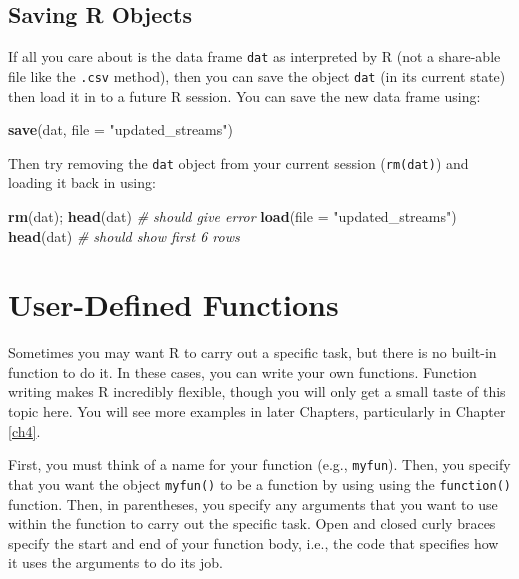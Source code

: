 \documentclass[]{book}
\newenvironment{Shaded}{\begin{snugshade}}{\end{snugshade}}
\newcommand{\KeywordTok}[1]{\textcolor[rgb]{0.13,0.29,0.53}{\textbf{#1}}}
\newcommand{\DataTypeTok}[1]{\textcolor[rgb]{0.13,0.29,0.53}{#1}}
\newcommand{\StringTok}[1]{\textcolor[rgb]{0.31,0.60,0.02}{#1}}
\newcommand{\CommentTok}[1]{\textcolor[rgb]{0.56,0.35,0.01}{\textit{#1}}}
\newcommand{\NormalTok}[1]{#1}
\theoremstyle{definition}
\theoremstyle{definition}
\theoremstyle{definition}
\theoremstyle{remark}
\begin{document}
\subsection{Saving R Objects}\label{saving-r-objects}

If all you care about is the data frame \texttt{dat} as interpreted by R
(not a share-able file like the \texttt{.csv} method), then you can save
the object \texttt{dat} (in its current state) then load it in to a
future R session. You can save the new data frame using:

\begin{Shaded}
\begin{Highlighting}[]
\KeywordTok{save}\NormalTok{(dat, }\DataTypeTok{file =} \StringTok{"updated_streams"}\NormalTok{)}
\end{Highlighting}
\end{Shaded}

Then try removing the \texttt{dat} object from your current session
(\texttt{rm(dat)}) and loading it back in using:

\begin{Shaded}
\begin{Highlighting}[]
\KeywordTok{rm}\NormalTok{(dat); }\KeywordTok{head}\NormalTok{(dat)  }\CommentTok{# should give error}
\KeywordTok{load}\NormalTok{(}\DataTypeTok{file =} \StringTok{"updated_streams"}\NormalTok{)}
\KeywordTok{head}\NormalTok{(dat) }\CommentTok{# should show first 6 rows}
\end{Highlighting}
\end{Shaded}

\section{User-Defined Functions}\label{user-funcs}

Sometimes you may want R to carry out a specific task, but there is no
built-in function to do it. In these cases, you can write your own
functions. Function writing makes R incredibly flexible, though you will
only get a small taste of this topic here. You will see more examples in
later Chapters, particularly in Chapter \ref{ch4}.

First, you must think of a name for your function (e.g.,
\texttt{myfun}). Then, you specify that you want the object
\texttt{myfun()} to be a function by using using the \texttt{function()}
function. Then, in parentheses, you specify any arguments that you want
to use within the function to carry out the specific task. Open and
closed curly braces specify the start and end of your function body,
i.e., the code that specifies how it uses the arguments to do its job.
\end{document}
